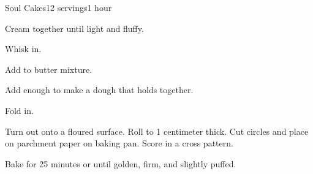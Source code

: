 \documentclass[../Cookbook.tex]{subfiles}
\begin{document}
\begin{recipe}[SoulCakes]{Soul Cakes}{12 servings}{1 hour}

Cream together until light and fluffy.

Whisk in.

Add to butter mixture.

Add enough to make a dough that holds together.

Fold in.

Turn out onto a floured surface.
Roll to 1 centimeter thick.
Cut circles and place on parchment paper on baking pan.
Score in a cross pattern.

Bake for 25 minutes or until golden, firm, and slightly puffed.


\end{recipe}
\end{document}
